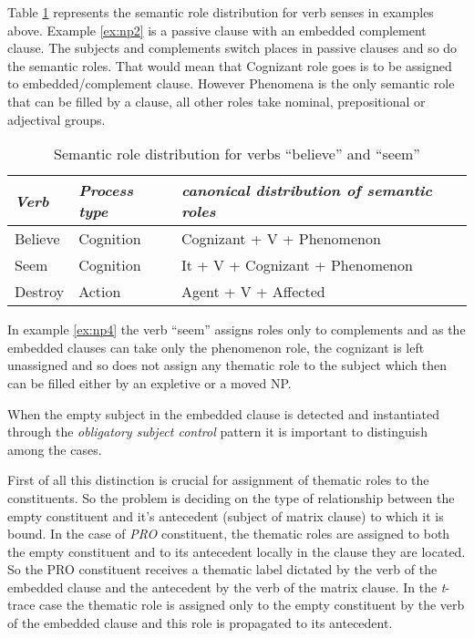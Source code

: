 Table \ref{tab:srl-for-example} represents the semantic role distribution for verb senses in examples above. Example \ref{ex:np2} is a passive clause with an embedded complement clause. The subjects and complements switch places in passive clauses and so do the semantic roles. That would mean that Cognizant role goes is to be assigned to embedded/complement clause. However Phenomena is the only semantic role that can be filled by a clause, all other roles take nominal, prepositional or adjectival groups.

\begin{table}[h]
    \centering
    \begin{tabular}{|l|l|l|}
        \hline
        \textit{Verb} & \textit{Process type} & \textit{canonical distribution of semantic roles} \\ \hline
        Believe & Cognition & Cognizant + V + Phenomenon \\ \hline
        Seem & Cognition & It + V + Cognizant + Phenomenon \\ \hline
        Destroy & Action & Agent + V + Affected \\ \hline
    \end{tabular}
    \caption{Semantic role distribution for verbs ``believe'' and ``seem''}
    \label{tab:srl-for-example}
\end{table}

In example \ref{ex:np4} the verb ``seem'' assigns roles only to complements and as the embedded clauses can take only the phenomenon role, the cognizant is left unassigned and so does not assign any thematic role to the subject which then can be filled either by an expletive or a moved NP. 


When the empty subject in the embedded clause is detected and instantiated through the \textit{obligatory subject control} pattern it is important to distinguish among the cases. 

First of all this distinction is crucial for assignment of thematic roles to the constituents. So the problem is deciding on the type of relationship between the empty constituent and it's antecedent (subject of matrix clause) to which it is bound. In the case of \textit{PRO} constituent, the thematic roles are assigned to both the empty constituent and to its antecedent locally in the clause they are located. So the PRO constituent receives a thematic label dictated by the verb of the embedded clause and the antecedent by the verb of the matrix clause. In the \textit{t}-trace case the thematic role is assigned only to the empty constituent by the verb of the embedded clause and this role is propagated to its antecedent. 

